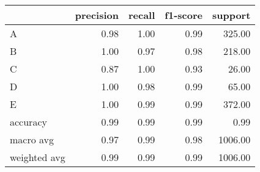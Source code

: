 \begin{tabular}{|l|r|r|r|r|}
\hline
{} &  precision &  recall &  f1-score &  support \\
\hline
A            &       0.98 &    1.00 &      0.99 &   325.00 \\
B            &       1.00 &    0.97 &      0.98 &   218.00 \\
C            &       0.87 &    1.00 &      0.93 &    26.00 \\
D            &       1.00 &    0.98 &      0.99 &    65.00 \\
E            &       1.00 &    0.99 &      0.99 &   372.00 \\
accuracy     &       0.99 &    0.99 &      0.99 &     0.99 \\
macro avg    &       0.97 &    0.99 &      0.98 &  1006.00 \\
weighted avg &       0.99 &    0.99 &      0.99 &  1006.00 \\
\hline
\end{tabular}
